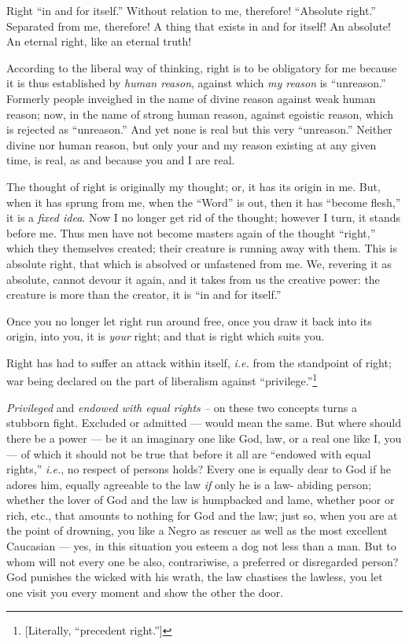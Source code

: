 Right ``in and for itself.'' Without relation to me, therefore! ``Absolute 
right.'' Separated from me, therefore! A thing that exists in and for itself! 
An absolute! An eternal right, like an eternal truth!

According to the liberal way of thinking, right is to be obligatory for me 
because it is thus established by \textit{human reason}, against which 
\textit{my reason} is ``unreason.'' Formerly people inveighed in the name of 
divine reason against weak human reason; now, in the name of strong human 
reason, against egoistic reason, which is rejected as ``unreason.'' And yet 
none is real but this very ``unreason.'' Neither divine nor human reason, 
but only your and my reason existing at any given time, is real, as and 
because you and I are real.

The thought of right is originally my thought; or, it has its origin in me. 
But, when it has sprung from me, when the ``Word'' is out, then it has 
``become flesh,'' it is a \textit{fixed idea}. Now I no longer get rid of 
the thought; however I turn, it stands before me. Thus men have not become 
masters again of the thought ``right,'' which they themselves created; their 
creature is running away with them. This is absolute right, that which is 
absolved or unfastened from me. We, revering it as absolute, cannot devour it 
again, and it takes from us the creative power: the creature is more than the 
creator, it is ``in and for itself.''

Once you no longer let right run around free, once you draw it back into its 
origin, into you, it is \textit{your} right; and that is right which suits 
you.

\myhrule


Right has had to suffer an attack within itself, \textit{i.e.} from the 
standpoint of right; war being declared on the part of liberalism against 
``privilege.''\footnote{[Literally, ``precedent right.'']}

\textit{Privileged} and \textit{endowed with equal rights --} on these two 
concepts turns a stubborn fight. Excluded or admitted --- would mean the same. 
But where should there be a power --- be it an imaginary one like God, law, or 
a real one like I, you --- of which it should not be true that before it all 
are ``endowed with equal rights,'' \textit{i.e.}, no respect of persons 
holds? Every one is equally dear to God if he adores him, equally agreeable to 
the law \textit{if} only he is a law- abiding person; whether the lover of God 
and the law is humpbacked and lame, whether poor or rich, etc., that amounts 
to nothing for God and the law; just so, when you are at the point of 
drowning, you like a Negro as rescuer as well as the most excellent Caucasian --- yes, in this situation you esteem a dog not less than a man. But to whom 
will not every one be also, contrariwise, a preferred or disregarded person? 
God punishes the wicked with his wrath, the law chastises the lawless, you let 
one visit you every moment and show the other the door.

